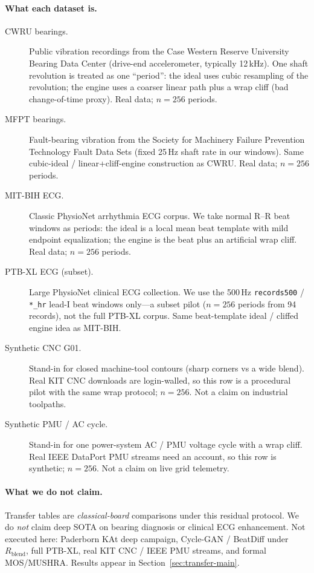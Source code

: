 \paragraph{What each dataset is.}
\begin{description}
  \item[CWRU bearings.]
    Public vibration recordings from the Case Western Reserve University Bearing Data Center
    (drive-end accelerometer, typically 12\,kHz).
    One shaft revolution is treated as one ``period'': the ideal uses cubic resampling of the revolution;
    the engine uses a coarser linear path plus a wrap cliff (bad change-of-time proxy).
    Real data; $n{=}256$ periods.
  \item[MFPT bearings.]
    Fault-bearing vibration from the Society for Machinery Failure Prevention Technology Fault Data Sets
    (fixed 25\,Hz shaft rate in our windows).
    Same cubic-ideal / linear+cliff-engine construction as CWRU.
    Real data; $n{=}256$ periods.
  \item[MIT-BIH ECG.]
    Classic PhysioNet arrhythmia ECG corpus.
    We take normal R--R beat windows as periods: the ideal is a local mean beat template with mild endpoint equalization;
    the engine is the beat plus an artificial wrap cliff.
    Real data; $n{=}256$ periods.
  \item[PTB-XL ECG (subset).]
    Large PhysioNet clinical ECG collection.
    We use the 500\,Hz \texttt{records500} / \texttt{*\_hr} lead-I beat windows only---a subset pilot
    ($n{=}256$ periods from 94 records), not the full PTB-XL corpus.
    Same beat-template ideal / cliffed engine idea as MIT-BIH.
  \item[Synthetic CNC G01.]
    Stand-in for closed machine-tool contours (sharp corners vs a wide blend).
    Real KIT CNC downloads are login-walled, so this row is a procedural pilot with the same wrap protocol;
    $n{=}256$. Not a claim on industrial toolpaths.
  \item[Synthetic PMU / AC cycle.]
    Stand-in for one power-system AC / PMU voltage cycle with a wrap cliff.
    Real IEEE DataPort PMU streams need an account, so this row is synthetic;
    $n{=}256$. Not a claim on live grid telemetry.
\end{description}

\paragraph{What we do not claim.}
Transfer tables are \emph{classical-board} comparisons under this residual protocol.
We do \emph{not} claim deep SOTA on bearing diagnosis or clinical ECG enhancement.
Not executed here: Paderborn KAt deep campaign, Cycle-GAN / BeatDiff under $R_{\mathrm{blend}}$,
full PTB-XL, real KIT CNC / IEEE PMU streams, and formal MOS/MUSHRA.
Results appear in Section~\ref{sec:transfer-main}.
